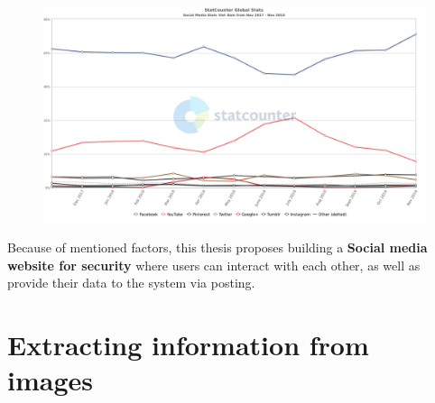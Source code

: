 \begin{center}
    \begin{figure}[H]
    \centering
    \includegraphics[width=1\columnwidth]{images/chap3/social_media_vn.png}
    \label{chap3:social_media_vn}
    \end{figure}
\end{center}
\vspace{-1cm}
Because of mentioned factors, this thesis proposes building a \textbf{Social media website for security} where users can interact with each other, as well as provide their data to the system via posting.
\section{Extracting information from images}

